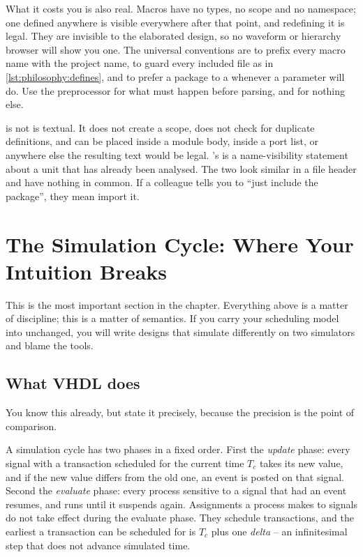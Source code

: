 What it costs you is also real. Macros have no types, no scope and no
namespace; one defined anywhere is visible everywhere after that point, and
redefining it is legal. They are invisible to the elaborated design, so no
waveform or hierarchy browser will show you one. The universal conventions are
to prefix every macro name with the project name, to guard every included file
as in \cref{lst:philosophy:defines}, and to prefer a package 
to a  whenever a parameter will do. Use the preprocessor for
what must happen before parsing, and for nothing else.

\begin{notebox}{ is not }
 is textual. It does not create a scope, does not check for
duplicate definitions, and can be placed inside a module body, inside a port
list, or anywhere else the resulting text would be legal. \VHDL{}'s 
is a name-visibility statement about a unit that has already been analysed. The
two look similar in a file header and have nothing in common. If a colleague
tells you to ``just include the package'', they mean import it.
\end{notebox}

\section{The Simulation Cycle: Where Your Intuition Breaks}
\label{sec:philosophy:sched}

This is the most important section in the chapter. Everything above is a matter
of discipline; this is a matter of semantics. If you carry your \VHDL{}
scheduling model into \SV{} unchanged, you will write designs that simulate
differently on two simulators and blame the tools.

\subsection{What VHDL does}

You know this already, but state it precisely, because the
precision is the point of comparison.

A \VHDL{} simulation cycle has two phases in a fixed order. First the
\emph{update} phase: every signal with a transaction scheduled for the current
time $T_c$ takes its new value, and if the new value differs from the old one,
an event is posted on that signal. Second the \emph{evaluate} phase: every
process sensitive to a signal that had an event resumes, and runs until it
suspends again. Assignments a process makes to signals do not take effect
during the evaluate phase. They schedule transactions, and the earliest a
transaction can be scheduled for is $T_c$ plus one \emph{delta} -- an
infinitesimal step that does not advance simulated time.

